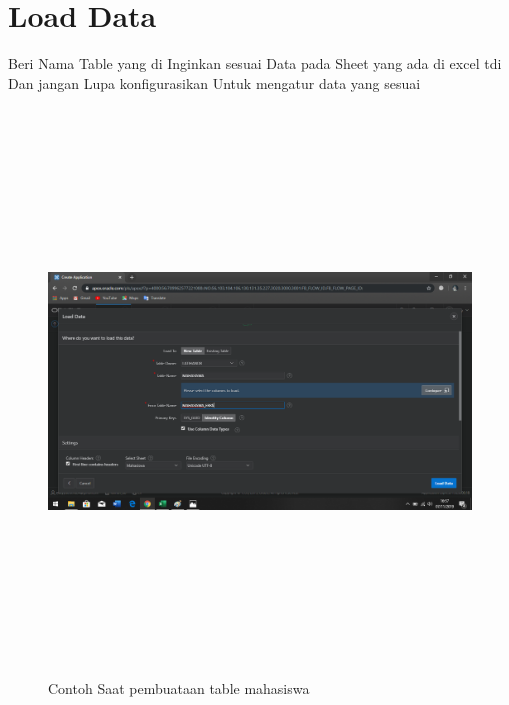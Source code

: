 \documentclass[a4, 13pt]{article}
\begin{document}
      \section{Load Data }
   Beri Nama Table yang di Inginkan sesuai Data pada Sheet yang ada di excel tdi Dan jangan Lupa konfigurasikan Untuk mengatur data yang sesuai
    \begin{figure}[!htbp]
        \centering
        \includegraphics[width=15cm, height=15cm]{pictures/B.png}
        \caption{Contoh Saat pembuataan table mahasiswa}
        \label{fig:my_label}
    \end{figure}
    \vspace{2cm}
    
\end{document}
